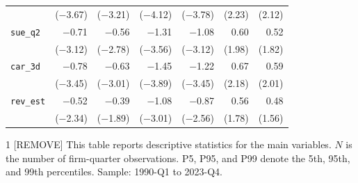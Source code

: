 \documentclass[12pt]{article}
\begin{document}
\begin{table}[!ht]
\begin{center}
{\begin{tabular}{l rr rr rr}
 & ($-$3.67) & ($-$3.21) & ($-$4.12) & ($-$3.78) & (2.23) & (2.12) \\
\addlinespace
\texttt{sue\_q2} & $-$0.71 & $-$0.56 & $-$1.31 & $-$1.08 & 0.60 & 0.52 \\
 & ($-$3.12) & ($-$2.78) & ($-$3.56) & ($-$3.12) & (1.98) & (1.82) \\
\addlinespace
\texttt{car\_3d} & $-$0.78 & $-$0.63 & $-$1.45 & $-$1.22 & 0.67 & 0.59 \\
 & ($-$3.45) & ($-$3.01) & ($-$3.89) & ($-$3.45) & (2.18) & (2.01) \\
\addlinespace
\texttt{rev\_est} & $-$0.52 & $-$0.39 & $-$1.08 & $-$0.87 & 0.56 & 0.48 \\
 & ($-$2.34) & ($-$1.89) & ($-$3.01) & ($-$2.56) & (1.78) & (1.56) \\
\bottomrule
\end{tabular}
}
\end{center}
\end{table}

\begin{table}[!ht]
\caption{[REMOVE] Summary Statistics.}
\begin{spacing}{1}
{\footnotesize
[REMOVE] This table reports descriptive statistics for the main variables. $N$ is the number of firm-quarter observations. P5, P95, and P99 denote the 5th, 95th, and 99th percentiles. Sample: 1990-Q1 to 2023-Q4.}
\end{spacing}
\vspace{-4mm}
\begin{center}
\label{tab:example_descriptive}
\vspace{2mm}
\end{center}
\end{table}
\end{document}
